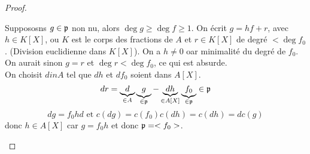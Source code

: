 \begin{proof}
\begin{itemize}
		      Suppososns $g \in \mathfrak{p}$ non nu, alors $ \deg g \geq \deg f \geq 1$.
		      On écrit $g = hf + r$, avec $h \in K[X]$, ou $K$ est le corps des fractions de $A$ et $r \in K[X]$ de degré $< \deg f_0$.
		      (Division euclidienne dans $K[X]$).
		      On a $h \neq 0$ oar minimalité du degré de $f_0$. On aurait sinon
		      $g = r$ et $\deg r < \deg f_0$, ce qui est absurde.\\
		      On choisit $d in A$ tel que $dh$ et $df_0$ soient dans $A[X]$.\\
		      $$ dr = \underbrace{d}_{\in A} \underbrace{g}_{\in \mathfrak{p}} - \underbrace{dh}_{\in A[X]} \underbrace{f_0}_{\in \mathfrak{p}} \in \mathfrak{p}$$
		      $$ dg =f_0hd \text{ et } c(dg) = c(f_0)c(dh) = c(dh) = dc(g)$$
		      donc $h \in A[X]$ car $g = f_0h$ et donc $\mathfrak{p} = <f_0>$.
	\end{itemize}
\end{proof}


